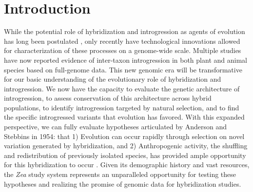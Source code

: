 
\begin{center}
\end{center}
%
%

\section*{Introduction}

While the potential role of hybridization and introgression as agents of evolution has long been postulated \citep{Anderson1948, Anderson1954, Stebbins1959}, only recently have technological innovations allowed for characterization of these processes on a genome-wide scale. 
Multiple studies have now reported evidence of inter-taxon introgression in both plant \citep{Hufford2013, renaut2013} and animal \citep{consortiumbutterfly2012, staubach2012, huerta2014} species based on full-genome data.
This new genomic era will be transformative for our basic understanding of the evolutionary role of hybridization and introgression.
We now have the capacity to evaluate the genetic architecture of introgression, to assess conservation of this architecture across hybrid populations, to identify introgression targeted by natural selection, and to find the specific introgressed variants that evolution has favored.
With this expanded perspective, we can fully evaluate hypotheses articulated by Anderson and Stebbins in 1954: that 1) Evolution can occur rapidly through selection on novel variation generated by hybridization, and 2) Anthropogenic activity, the shuffling and redistribution of previously isolated species, has provided ample opportunity for this hybridization to occur \citep{Anderson1954}.
Given its demographic history and vast resources, the \emph{Zea} study system represents an unparalleled opportunity for testing these hypotheses and realizing the promise of genomic data for hybridization studies. 

